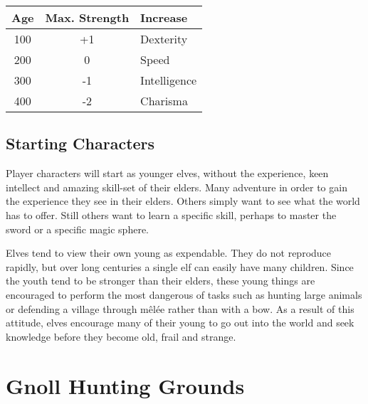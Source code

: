 \begin{multicols}{2}
	\begin{tabular}{ccl}

		Age & Max. Strength & Increase \\\hline

		100 & +1 & Dexterity \\

		200 & 0 & Speed \\

		300 & -1 & Intelligence \\

		400 & -2 & Charisma \\

	\end{tabular}

\subsection{Starting Characters}

Player characters will start as younger elves, without the experience, keen intellect and amazing skill-set of their elders. Many adventure in order to gain the experience they see in their elders. Others simply want to see what the world has to offer. Still others want to learn a specific skill, perhaps to master the sword or a specific magic sphere.

Elves tend to view their own young as expendable.
They do not reproduce rapidly, but over long centuries a single elf can easily have many children.
Since the youth tend to be stronger than their elders, these young things are encouraged to perform the most dangerous of tasks such as hunting large animals or defending a village through m\^{e}l\'{e}e rather than with a bow.
As a result of this attitude, elves encourage many of their young to go out into the world and seek knowledge before they become old, frail and strange.

\end{multicols}

\section[Gnolls]{Gnoll Hunting Grounds}

